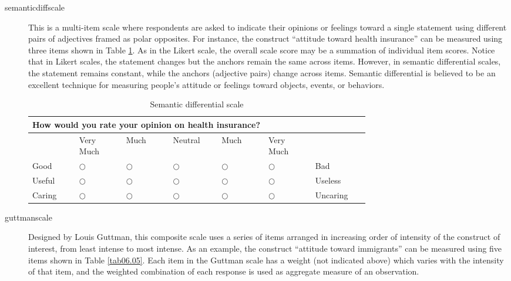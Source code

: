 \begin{description}
	\item[\Gls{semanticdiffscale}] This is a multi-item scale where respondents are asked to indicate their opinions or feelings toward a single statement using different pairs of adjectives framed as polar opposites. For instance, the construct ``attitude toward health insurance'' can be measured using three items shown in Table \ref{tab06.04}. As in the Likert scale, the overall scale score may be a summation of individual item scores. Notice that in Likert scales, the statement changes but the anchors remain the same across items. However, in semantic differential scales, the statement remains constant, while the anchors (adjective pairs) change across items. Semantic differential is believed to be an excellent technique for measuring people's attitude or feelings toward objects, events, or behaviors. 
	
	
	\begin{table}[H]
		\centering
		\begin{tabularx}{0.95\linewidth}{p{0.10\linewidth}p{0.10\linewidth}p{0.10\linewidth}p{0.10\linewidth}p{0.10\linewidth}p{0.10\linewidth}p{0.10\linewidth}}
			\toprule
			\multicolumn{7}{p{0.95\linewidth}}{How would you rate your opinion on health insurance?} \\	
			\midrule
			{} & {\footnotesize Very Much} & {\footnotesize Much} & {\footnotesize Neutral} & {\footnotesize Much} & {\footnotesize Very Much} & {} \\
			\midrule
			{\footnotesize Good} & $ \bigcirc $ & $ \bigcirc $ & $ \bigcirc $ & $ \bigcirc $ & $ \bigcirc $ & {\footnotesize Bad} \\
			{\footnotesize Useful} & $ \bigcirc $ & $ \bigcirc $ & $ \bigcirc $ & $ \bigcirc $ & $ \bigcirc $ & {\footnotesize Useless} \\
			{\footnotesize Caring} & $ \bigcirc $ & $ \bigcirc $ & $ \bigcirc $ & $ \bigcirc $ & $ \bigcirc $ & {\footnotesize Uncaring} \\
			\bottomrule
		\end{tabularx}
		\caption{Semantic differential scale}
		\label{tab06.04}
	\end{table}
	
	\item[\Gls{guttmanscale}] Designed by Louis Guttman, this composite scale uses a series of items arranged in increasing order of intensity of the construct of interest, from least intense to most intense. As an example, the construct ``attitude toward immigrants'' can be measured using five items shown in Table \ref{tab06.05}. Each item in the Guttman scale has a weight (not indicated above) which varies with the intensity of that item, and the weighted combination of each response is used as aggregate measure of an observation.
	

\end{description}
